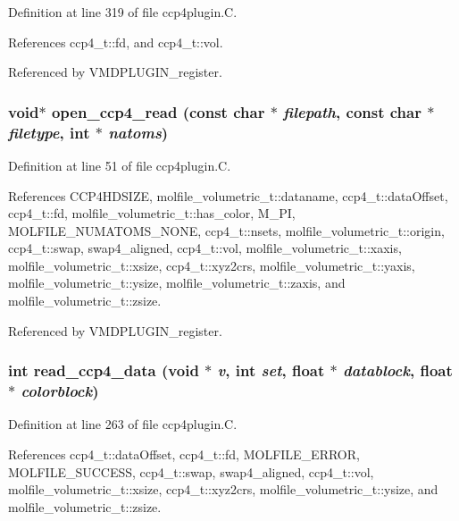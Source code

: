 Definition at line 319 of file ccp4plugin.C.

References ccp4\_\-t::fd, and ccp4\_\-t::vol.

Referenced by VMDPLUGIN\_\-register.
\subsubsection{\setlength{\rightskip}{0pt plus 5cm}void$\ast$ open\_\-ccp4\_\-read (const char $\ast$ {\em filepath}, const char $\ast$ {\em filetype}, int $\ast$ {\em natoms})\hspace{0.3cm}{\tt  [static]}}\label{ccp4plugin_8C_a3}




Definition at line 51 of file ccp4plugin.C.

References CCP4HDSIZE, molfile\_\-volumetric\_\-t::dataname, ccp4\_\-t::data\-Offset, ccp4\_\-t::fd, molfile\_\-volumetric\_\-t::has\_\-color, M\_\-PI, MOLFILE\_\-NUMATOMS\_\-NONE, ccp4\_\-t::nsets, molfile\_\-volumetric\_\-t::origin, ccp4\_\-t::swap, swap4\_\-aligned, ccp4\_\-t::vol, molfile\_\-volumetric\_\-t::xaxis, molfile\_\-volumetric\_\-t::xsize, ccp4\_\-t::xyz2crs, molfile\_\-volumetric\_\-t::yaxis, molfile\_\-volumetric\_\-t::ysize, molfile\_\-volumetric\_\-t::zaxis, and molfile\_\-volumetric\_\-t::zsize.

Referenced by VMDPLUGIN\_\-register.
\subsubsection{\setlength{\rightskip}{0pt plus 5cm}int read\_\-ccp4\_\-data (void $\ast$ {\em v}, int {\em set}, float $\ast$ {\em datablock}, float $\ast$ {\em colorblock})\hspace{0.3cm}{\tt  [static]}}\label{ccp4plugin_8C_a5}




Definition at line 263 of file ccp4plugin.C.

References ccp4\_\-t::data\-Offset, ccp4\_\-t::fd, MOLFILE\_\-ERROR, MOLFILE\_\-SUCCESS, ccp4\_\-t::swap, swap4\_\-aligned, ccp4\_\-t::vol, molfile\_\-volumetric\_\-t::xsize, ccp4\_\-t::xyz2crs, molfile\_\-volumetric\_\-t::ysize, and molfile\_\-volumetric\_\-t::zsize.

